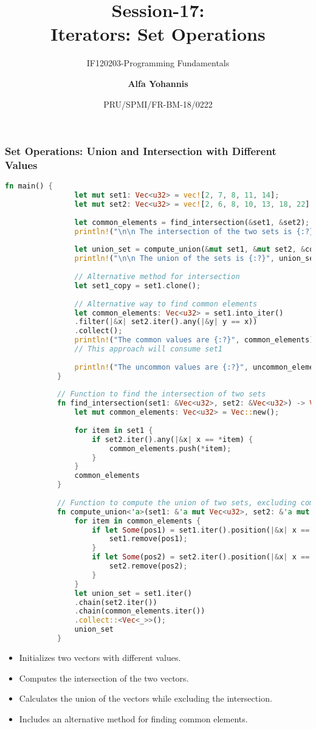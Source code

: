 \documentclass[aspectratio=169, table]{beamer}
\subtitle{IF120203-Programming Fundamentals}
\title{Session-17:\\\LARGE{Iterators: Set Operations}\\ \vspace{10pt}}
\date[Serial]{\scriptsize {PRU/SPMI/FR-BM-18/0222}}
\author[Pradita]{\small{\textbf{Alfa Yohannis}}}
\begin{document}
	
	\frame{\titlepage}
	
	\begin{frame}[fragile]
		\frametitle{Set Operations: Union and Intersection with Different Values}
		\begin{lstlisting}[language=Rust]
			fn main() {
				let mut set1: Vec<u32> = vec![2, 7, 8, 11, 14];
				let mut set2: Vec<u32> = vec![2, 6, 8, 10, 13, 18, 22];
				
				let common_elements = find_intersection(&set1, &set2);
				println!("\n\n The intersection of the two sets is {:?}", common_elements);
				
				let union_set = compute_union(&mut set1, &mut set2, &common_elements);
				println!("\n\n The union of the sets is {:?}", union_set);
				
				// Alternative method for intersection
				let set1_copy = set1.clone();
				
				// Alternative way to find common elements
				let common_elements: Vec<u32> = set1.into_iter()
				.filter(|&x| set2.iter().any(|&y| y == x))
				.collect();
				println!("The common values are {:?}", common_elements);
				// This approach will consume set1
				
				println!("The uncommon values are {:?}", uncommon_elements);
			}
			
			// Function to find the intersection of two sets
			fn find_intersection(set1: &Vec<u32>, set2: &Vec<u32>) -> Vec<u32> {
				let mut common_elements: Vec<u32> = Vec::new();
				
				for item in set1 {
					if set2.iter().any(|&x| x == *item) {
						common_elements.push(*item);
					}
				}
				common_elements
			}
			
			// Function to compute the union of two sets, excluding common elements
			fn compute_union<'a>(set1: &'a mut Vec<u32>, set2: &'a mut Vec<u32>, common_elements: &'a Vec<u32>) -> Vec<&'a u32> {
				for item in common_elements {
					if let Some(pos1) = set1.iter().position(|&x| x == *item) {
						set1.remove(pos1);
					}
					if let Some(pos2) = set2.iter().position(|&x| x == *item) {
						set2.remove(pos2);
					}
				}
				let union_set = set1.iter()
				.chain(set2.iter())
				.chain(common_elements.iter())
				.collect::<Vec<_>>();
				union_set
			}
		\end{lstlisting}
		\begin{itemize}
			\item Initializes two vectors with different values.
			\item Computes the intersection of the two vectors.
			\item Calculates the union of the vectors while excluding the intersection.
			\item Includes an alternative method for finding common elements.
		\end{itemize}
	\end{frame}
	
\end{document}
